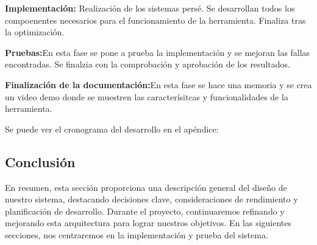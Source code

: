  \textbf{Implementación:} Realización de los sistemas persé. Se desarrollan todos los compoenentes necesarios para el funcionamiento de la herramienta. Finaliza tras la optimización. 

 \textbf{Pruebas:}En esta fase se pone a prueba la implementación y se mejoran las fallas encontradas. Se finalzia con la comprobación y aprobación de los resultados.
 
 \textbf{Finalización de la documentación:}En esta fase se hace una memoria y se crea un video demo donde se muestren las caracterísitcas y funcionalidades de la herramienta.


 Se puede ver el cronograma del desarrollo en el apéndice: 

\subsection{Conclusión}

En resumen, esta sección proporciona una descripción general del diseño de nuestro sistema, destacando decisiones clave, consideraciones de rendimiento y planificación de desarrollo. Durante el proyecto, continuaremos refinando y mejorando esta arquitectura para lograr nuestros objetivos. En las siguientes secciones, nos centraremos en la implementación y prueba del sistema.
